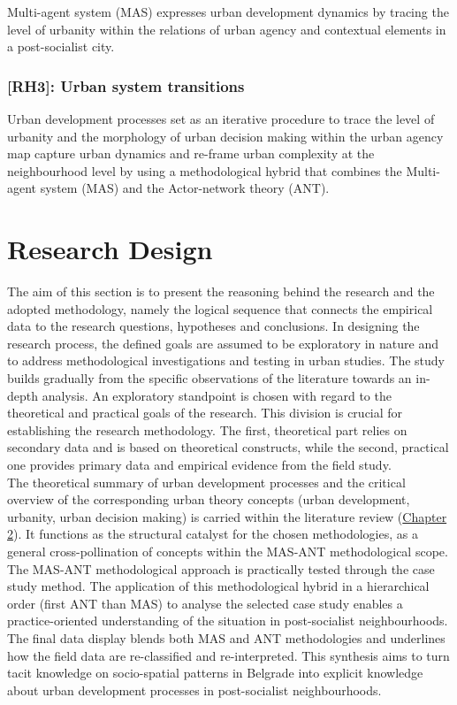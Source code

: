 \documentclass[11pt]{report}
\begin{document}
Multi-agent system (MAS) expresses urban development dynamics by tracing the level of urbanity within the relations of urban agency and contextual elements in a post-socialist city.

\subsubsection{[RH3]: Urban system transitions}

Urban development processes set as an iterative procedure to trace the level of urbanity and the morphology of urban decision making within the urban agency map capture urban dynamics and re-frame urban complexity at the neighbourhood level by using a methodological hybrid that combines the Multi-agent system (MAS) and the Actor-network theory (ANT).

\section{Research Design}

The aim of this section is to present the reasoning behind the research and the adopted methodology, namely the logical sequence that connects the empirical data to the research questions, hypotheses and conclusions. In designing the research process, the defined goals are assumed to be exploratory in nature and to address methodological investigations and testing in urban studies. The study builds gradually from the specific observations of the literature towards an in-depth analysis. An exploratory standpoint is chosen with regard to the theoretical and practical goals of the research. This division is crucial for establishing the research methodology. The first, theoretical part relies on secondary data and is based on theoretical constructs, while the second, practical one provides primary data and empirical evidence from the field study.
\\

The theoretical summary of urban development processes and the critical overview of the corresponding urban theory concepts (urban development, urbanity, urban decision making) is carried within the literature review  (\href{Chapter 2}{Chapter 2}). It functions as the structural catalyst for the chosen methodologies, as a general cross-pollination of concepts within the MAS-ANT methodological scope. The MAS-ANT methodological approach is practically tested through the case study method. The application of this methodological hybrid in a hierarchical order (first ANT than MAS) to analyse the selected case study enables a practice-oriented understanding of the situation in post-socialist neighbourhoods. The final data display blends both MAS and ANT methodologies and underlines how the field data are re-classified and re-interpreted. This synthesis aims to turn tacit knowledge on socio-spatial patterns in Belgrade into explicit knowledge about urban development processes in post-socialist neighbourhoods.
\\
\end{document}
